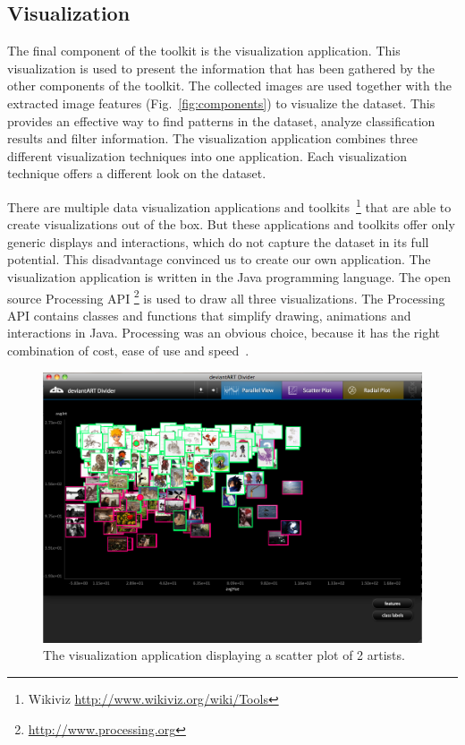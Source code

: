 
\subsection{Visualization}
The final component of the toolkit is the visualization application.
This visualization is used to present the information that has been gathered by the other components of the toolkit.
The collected images are used together with the extracted image features (Fig.~\ref{fig:components}) to visualize the dataset.
This provides an effective way to find patterns in the dataset, analyze classification results and filter information.
The visualization application combines three different visualization techniques into one application.
Each visualization technique offers a different look on the dataset.

There are multiple data visualization applications and toolkits~\footnote{Wikiviz \url{http://www.wikiviz.org/wiki/Tools}} that are able to create visualizations out of the box.
But these applications and toolkits offer only generic displays and interactions, which do not capture the dataset in its full potential.
This disadvantage convinced us to create our own application.
The visualization application is written in the Java programming language.
The open source Processing API \footnote{\url{http://www.processing.org}} is used to draw all three visualizations.
The Processing API contains classes and functions that simplify drawing, animations and interactions in Java.
Processing was an obvious choice, because it has the right combination of cost, ease of use and speed~\cite{fry08}.

\begin{figure}[htb]
  \centering
  \includegraphics[width=1\linewidth]{img/visualization_scatter.png}
  \caption{The visualization application displaying a scatter plot of 2 artists.}
  \label{fig:visualization_scatter}
\end{figure}

